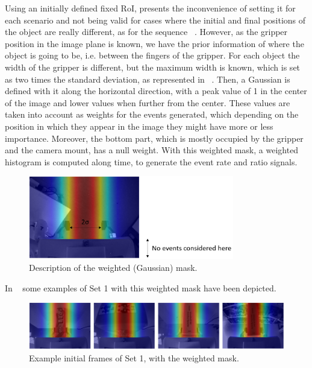 Using an initially defined fixed RoI, presents the inconvenience of setting it for each scenario and not being valid for cases where the initial and final positions of the object are really different, as for the sequence ~. However, as the gripper position in the image plane is known, we have the prior information of where the object is going to be, i.e. between the fingers of the gripper. For each object the width of the gripper is different, but the maximum width is known, which is set as two times the standard deviation, as represented in ~. Then, a Gaussian is defined with it along the horizontal direction, with a peak value of 1 in the center of the image and lower values when further from the center. These values are taken into account as weights for the events generated, which depending on the position in which they appear in the image they might have more or less importance. Moreover, the bottom part, which is mostly occupied by the gripper and the camera mount, has a null weight. With this weighted mask, a weighted histogram is computed along time, to generate the event rate and ratio signals.

\begin{figure}[h]
    \centering
    \includegraphics[width=0.8\textwidth]{resources/images/gaus_mask}
    \caption{Description of the weighted (Gaussian) mask.}\label{fig:gaus_mask}
\end{figure}

In ~ some examples of Set 1 with this weighted mask have been depicted.

\begin{figure}[h]
    \centering
    \includegraphics[width=\textwidth]{resources/images/fix_mask}
    \caption{Example initial frames of Set 1, with the weighted mask.}\label{fig:fix_mask}
\end{figure}

